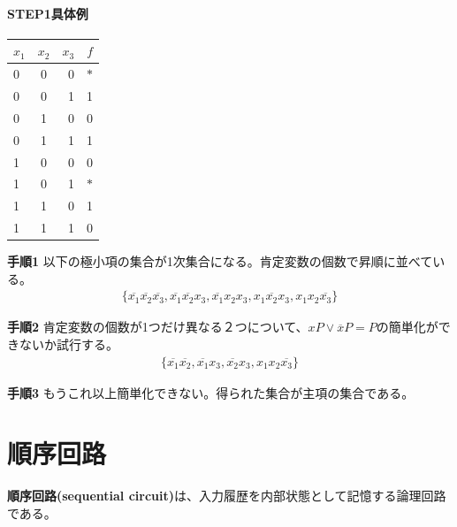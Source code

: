 \documentclass[a4j,10pt,oneside,openany,fleqn]{jsbook}
\newcommand{\xbar}[1]{\overline{x_{#1}}}
\begin{document}
\subsubsection{STEP1具体例}
\begin{table}[htb]
  \begin{center}
    \begin{tabular}{lcr|r} 
      $x_1$ & $x_2$ & $x_3$ & $f$ \\ \hline 
      0 & 0 & 0 & $\ast$ \\
      0 & 0 & 1 & 1 \\
      0 & 1 & 0 & 0 \\
      0 & 1 & 1 & 1 \\
      1 & 0 & 0 & 0 \\
      1 & 0 & 1 & $\ast$ \\
      1 & 1 & 0 & 1 \\
      1 & 1 & 1 & 0 \\
    \end{tabular}
  \end{center}
\end{table}

\textbf{手順1}
以下の極小項の集合が1次集合になる。肯定変数の個数で昇順に並べている。
\begin{align*}
  \{\xbar{1}\xbar{2}\xbar{3}, \xbar{1}\xbar{2}x_3, \xbar{1}x_2 x_3, x_1 \xbar{2} x_3, x_1 x_2 \xbar{3}\}
\end{align*}

\textbf{手順2}
肯定変数の個数が1つだけ異なる２つについて、$xP \vee \overline{x}P = P$の簡単化ができないか試行する。
\begin{align*}
  \{\xbar{1}\xbar{2}, \xbar{1} x_3, \xbar{2} x_3, x_1 x_2 \xbar{3}\}
\end{align*}

\textbf{手順3}
もうこれ以上簡単化できない。得られた集合が主項の集合である。



\chapter{順序回路}
\textbf{順序回路(sequential circuit)}は、入力履歴を内部状態として記憶する論理回路である。
\end{document}
